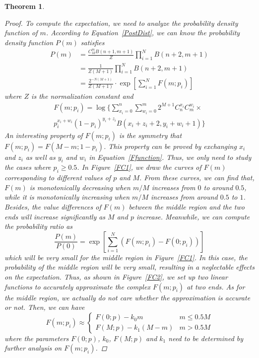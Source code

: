 \documentclass{article}
\newtheorem{theorem}{Theorem}
\begin{document}
\begin{theorem}
\begin{proof}
To compute the expectation, we need to analyze the probability density function of $m$. According to Equation~\ref{PostDist}, we can know the probability density function $P(m)$ satisfies
\begin{equation}
\label{PDist}
\begin{split}
P(m) &= \frac{C_{M}^{m}B(n+1,m+1)}{Z}\prod_{i=1}^{N}B(n+2,m+1)\\
&=\frac{1}{Z(M+1)}\prod_{i=1}^{N}B(n+2,m+1)\\
&=\frac{2^{-N(M+1)}}{Z(M+1)}\cdot \exp{\left[\sum_{i=1}^{N}F(m;p_i)\right]}
\end{split}
\end{equation}
where $Z$ is the normalization constant and 
\begin{equation}
\label{Ffunction}
\begin{split}
F(m;p_i)=\log\Big\{{\sum}_{x_i=0}^{n}{\sum}_{w_i=0}^{m} 2^{M+1}C_{n}^{x_i}C_{m}^{w_i}\times\\
p_i^{x_i+w_i}(1-p_i)^{y_i+z_i}B(x_i+z_i+2,y_i+w_i+1)\Big\}
\end{split}
\end{equation}
An interesting property of $F(m;p_i)$ is the symmetry that $F(m;p_i)=F(M-m; 1-p_i)$.
This property can be proved by exchanging $x_i$ and $z_i$ as well as $y_i$ and $w_i$ in Equation~\ref{Ffunction}.
Thus, we only need to study the cases where $p_i\geq 0.5$.
In Figure~\ref{FC1}, we draw the curves of $F(m)$ corresponding to different values of $p$ and $M$.
From these curves, we can find that, $F(m)$ is monotonically decreasing when $m/M$ increases from $0$ to around $0.5$, while it is monotonically increasing when $m/M$ increases from around $0.5$ to $1$.
Besides, the value differences of $F(m)$ between the middle region and the two ends will increase significantly as $M$ and $p$ increase.
Meanwhile, we can compute the probability ratio as 
\begin{equation}
\frac{P(m)}{P(0)}=\exp{\left[\sum_{i=1}^{N}\left(F(m;p_i)-F(0;p_i)\right)\right]}
\end{equation}
which will be very small for the middle region in Figure~\ref{FC1}.
In this case, the probability of the middle region will be very small, resulting in a neglectable effects on the expectation.
Thus, as shown in Figure~\ref{FC2}, we set up two linear functions to accurately approximate the complex $F(m;p_i)$ at two ends.
As for the middle region, we actually do not care whether the approximation is accurate or not.
Then, we can have
\begin{equation*}
F(m;p_i)\approx     \left\{
    \begin{array}{cl}
    F(0;p)-k_0 m & m\leq 0.5M\\
    F(M;p)-k_1(M-m) & m>0.5M
    \end{array}\right.
\end{equation*}
where the parameters $F(0;p)$, $k_0$, $F(M;p)$ and $k_1$ need to be determined by further analysis on $F(m;p_i)$.


\end{proof}
\end{theorem}
\end{document}
